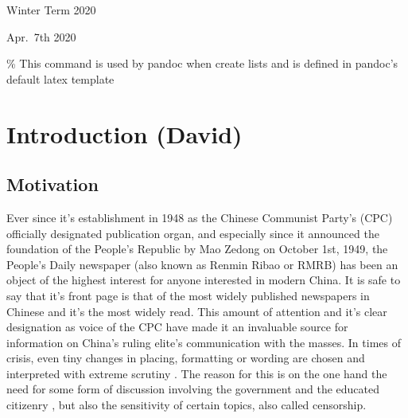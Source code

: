 \documentclass[12pt,a4paper]{article}
\begin{document}
\begin{titlepage}
  \noindent\begin{minipage}[t]{0.5\textwidth}
  \end{minipage}
  \begin{minipage}[t]{0.7\textwidth}
  \hspace{1cm}Winter Term 2020
  \end{minipage}

  \noindent\begin{minipage}[t]{0.5\textwidth}
  \end{minipage}
  \begin{minipage}[t]{0.7\textwidth}
  \hspace{1cm}Apr.~7th 2020
  \end{minipage}

\end{titlepage}

\restoregeometry


{
\hypersetup{linkcolor=black}
\setcounter{tocdepth}{3}
\tableofcontents
}
\newpage
\listoftables
\newpage
\listoffigures
\newpage
{} 
\% This command is used by pandoc when create lists and is defined in
pandoc's default latex template \providecommand{\tightlist}{%
  \setlength{\itemsep}{0pt}\setlength{\parskip}{0pt}}

\hypertarget{introduction-david}{%
\section{Introduction (David)}\label{introduction-david}}

\hypertarget{motivation}{%
\subsection{Motivation}\label{motivation}}

Ever since it's establishment in 1948 as the Chinese Communist Party's
(CPC) officially designated publication organ, and especially since it
announced the foundation of the People's Republic by Mao Zedong on
October 1st, 1949, the People's Daily newspaper (also known as Renmin
Ribao or RMRB) has been an object of the highest interest for anyone
interested in modern China. It is safe to say that it's front page is
that of the most widely published newspapers in Chinese and it's the
most widely read. This amount of attention and it's clear designation as
voice of the CPC have made it an invaluable source for information on
China's ruling elite's communication with the masses. In times of
crisis, even tiny changes in placing, formatting or wording are chosen
and interpreted with extreme scrutiny \textcite{tan1990}. The reason for
this is on the one hand the need for some form of discussion involving
the government and the educated citizenry \textcite{kuhn2002}, but also
the sensitivity of certain topics, also called censorship.
\end{document}
